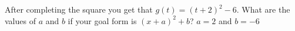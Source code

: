 {After completing the square you get that $g(t)=(t+2)^2-6$. What are the values of $a$ and $b$ if your goal form is $(x+a)^2+b$?}
{$a=2$ and $b=-6$}
